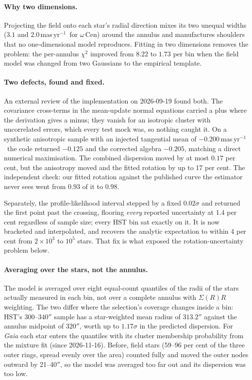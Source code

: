 \documentclass[11pt,a4paper]{article}
\newcommand{\masyr}{mas\,yr$^{-1}$}
\newcommand{\ocen}{$\omega$\,Cen}
\begin{document}
\paragraph{Why two dimensions.} Projecting the field onto each star's radial direction mixes
its two unequal widths ($3.1$ and $2.0$\,\masyr\ for \ocen) around the annulus and
manufactures shoulders that no one-dimensional model reproduces. Fitting in two dimensions
removes the problem: the per-annulus $\chi^2$ improved from $8.22$ to $1.73$ per bin when the
field model was changed from two Gaussians to the empirical template.

\paragraph{Two defects, found and fixed.} An external review of the implementation on
2026-09-19 found both. The covariance cross-terms in the mean-update normal equations carried
a plus where the derivation gives a minus; they vanish for an isotropic cluster with
uncorrelated errors, which every test mock was, so nothing caught it. On a synthetic
anisotropic sample with an injected tangential mean of $-0.200$\,\masyr\ the code returned
$-0.125$ and the corrected algebra $-0.205$, matching a direct numerical maximisation. The
combined dispersion moved by at most $0.17$ per cent, but the anisotropy moved and the fitted
rotation by up to 17 per cent. The independent check: our fitted rotation against the
published curve the estimator never sees went from $0.93$ of it to $0.98$.

Separately, the profile-likelihood interval stepped by a fixed $0.02\sigma$ and returned the
first point past the crossing, flooring \emph{every} reported uncertainty at $1.4$ per cent
regardless of sample size; every HST bin sat exactly on it. It is now bracketed and
interpolated, and recovers the analytic expectation to within 4 per cent from $2\times10^3$
to $10^5$ stars. That fix is what exposed the rotation-uncertainty problem below.

\paragraph{Averaging over the stars, not the annulus.} The model is averaged over eight
equal-count quantiles of the radii of the stars actually measured in each bin, not over a
complete annulus with $\Sigma(R)R$ weighting. The two differ where the selection's coverage
changes inside a bin: HST's $300$--$340''$ sample has a star-weighted mean radius of
$313.2''$ against the annulus midpoint of $320''$, worth up to $1.17\sigma$ in the predicted
dispersion. For \emph{Gaia} each star enters the quantiles with its cluster membership
probability from the mixture fit (since 2026-11-16). Before, field stars (59--96 per cent of
the three outer rings, spread evenly over the area) counted fully and moved the outer nodes
outward by 21--40$''$, so the model was averaged too far out and its dispersion was too low.
\end{document}
